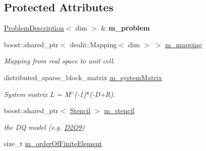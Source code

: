 \subsection*{Protected Attributes}
\begin{DoxyCompactItemize}
\item 
\hypertarget{classnatrium_1_1AdvectionOperator_afa85027b7416373a3b5ea63719716da2}{
\hyperlink{classnatrium_1_1ProblemDescription}{ProblemDescription}$<$ dim $>$ \& {\bfseries m\_\-problem}}
\label{classnatrium_1_1AdvectionOperator_afa85027b7416373a3b5ea63719716da2}

\item 
\hypertarget{classnatrium_1_1AdvectionOperator_a1166202d92f4bd8ead4b5486540eb34d}{
boost::shared\_\-ptr$<$ dealii::Mapping$<$ dim $>$ $>$ \hyperlink{classnatrium_1_1AdvectionOperator_a1166202d92f4bd8ead4b5486540eb34d}{m\_\-mapping}}
\label{classnatrium_1_1AdvectionOperator_a1166202d92f4bd8ead4b5486540eb34d}

\begin{DoxyCompactList}\small\item\em Mapping from real space to unit cell. \item\end{DoxyCompactList}\item 
\hypertarget{classnatrium_1_1AdvectionOperator_a01fe6ea5b78b0482d08d30a525f66f1c}{
distributed\_\-sparse\_\-block\_\-matrix \hyperlink{classnatrium_1_1AdvectionOperator_a01fe6ea5b78b0482d08d30a525f66f1c}{m\_\-systemMatrix}}
\label{classnatrium_1_1AdvectionOperator_a01fe6ea5b78b0482d08d30a525f66f1c}

\begin{DoxyCompactList}\small\item\em System matrix L = M$^\wedge$(-\/1)$\ast$(-\/D+R). \item\end{DoxyCompactList}\item 
\hypertarget{classnatrium_1_1AdvectionOperator_abf58a2b8f218438a3557d8217d6b76c7}{
boost::shared\_\-ptr$<$ \hyperlink{classnatrium_1_1Stencil}{Stencil} $>$ \hyperlink{classnatrium_1_1AdvectionOperator_abf58a2b8f218438a3557d8217d6b76c7}{m\_\-stencil}}
\label{classnatrium_1_1AdvectionOperator_abf58a2b8f218438a3557d8217d6b76c7}

\begin{DoxyCompactList}\small\item\em the DQ model (e.g. \hyperlink{classnatrium_1_1D2Q9}{D2Q9}) \item\end{DoxyCompactList}\item 
\hypertarget{classnatrium_1_1AdvectionOperator_afcff42a6fd461409e87b5aca7f0bb217}{
size\_\-t \hyperlink{classnatrium_1_1AdvectionOperator_afcff42a6fd461409e87b5aca7f0bb217}{m\_\-orderOfFiniteElement}}
\label{classnatrium_1_1AdvectionOperator_afcff42a6fd461409e87b5aca7f0bb217}


\end{DoxyCompactItemize}
